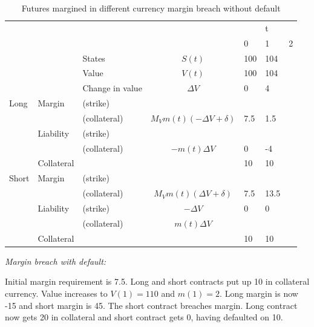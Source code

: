 \documentclass[12pt]{article}
\begin{document}
\begin{table}
\begin{tabular}{lll|c|lll}
&  &  &  &  & t &\\  
&  &  &  & 0 & 1 & 2\\
\hline
\hline
&  & States &  $S(t)$ & 100 & 104 & \\
&  & Value  &  $V(t)$  & 100 & 104 &  \\
&  & Change in value & $\Delta V$ & 0& 4 &  \\
\hline
Long      & Margin    & (strike)     &  &  &  &  \\
          &           & (collateral) & $M_V m(t)(-\Delta V + \delta)$ & 7.5 & 1.5 &\\ 
          & Liability & (strike)     &  &  &  & \\ 
          &           & (collateral)&$-m(t) \Delta V$ & 0  & -4 &\\
          & Collateral&                       &    & 10 & 10 & \\
\hline
Short     & Margin    & (strike)     &   &  &  & \\
          &           & (collateral) & $M_V m(t)(\Delta V + \delta)$& 7.5 & 13.5 &\\
          & Liability & (strike)     & $-\Delta V$ & 0 & 0 & \\
          &           & (collateral) & $m(t)\Delta V$ & & &\\
          & Collateral&                       &    & 10 & 10 & \\ 
\hline          

\end{tabular}
\caption{Futures margined in different currency margin breach without default}
\label{fut}
\end{table}




\textit{Margin breach with default:}

Initial margin requirement is 7.5. Long and short contracts put up 10 in collateral currency. Value increases to $V(1) = 110$ and $m(1)=2$. Long margin is now -15 and short margin is 45.  The short contract breaches margin. Long contract now gets 20 in collateral and short contract gets 0, having defaulted on 10.
\end{document}
